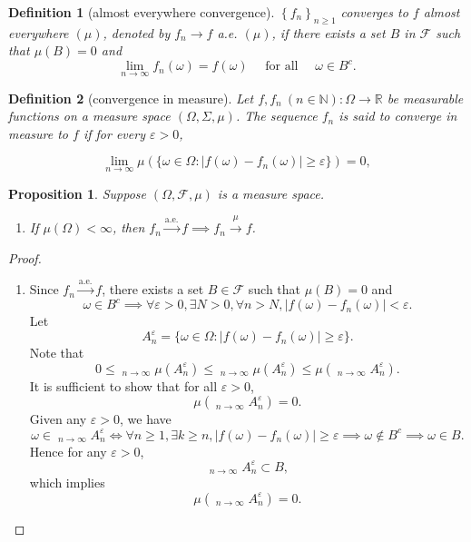 \documentclass{report}
\newtheorem{definition}{Definition}[section]
\newtheorem{proposition}{Proposition}[section]
\theoremstyle{nonumberplain}
\newtheorem{proof}{Proof.}
\DeclareMathOperator*\lowlim{\underline{lim}}
\DeclareMathOperator*\uplim{\overline{lim}}
\begin{document}
\begin{definition}[almost everywhere convergence]
	$\left\{f_{n}\right\}_{n \geq 1}$ converges to $f$ almost everywhere $(\mu)$, denoted by $f_{n} \rightarrow f$ a.e. $(\mu)$, if there exists a set $B$ in $\mathcal{F}$ such that $\mu(B)=0$ and
	$$
	\lim _{n \rightarrow \infty} f_{n}(\omega)=f(\omega) \quad \text { for all } \quad \omega \in B^{c} .
	$$
\end{definition}

\begin{definition}[convergence in measure]
	Let $f,f_{n}\ (n\in {\mathbb  N}):\Omega\to {\mathbb  R}$ be measurable functions on a measure space $(\Omega,\Sigma ,\mu )$. The sequence $ f_{n}$ is said to converge in measure to $f$ if for every $\varepsilon >0$,
	
	$$\lim_{{n\to \infty }}\mu \left(\{\omega\in \Omega:|f(\omega)-f_{n}(\omega)|\geq \varepsilon \}\right)=0,$$
\end{definition}

\begin{proposition}
	Suppose $(\Omega,\mathcal{F},\mu)$ is a measure space.
	\begin{enumerate}
		\item If $\mu(\Omega)<\infty$, then $f_n\xrightarrow{\text{a.e.}}f\implies f_n\xrightarrow{\mu}f$.
	\end{enumerate}
\end{proposition}
\begin{proof}
	\begin{enumerate}
		\item 
		Since $f_n\xrightarrow{\text{a.e.}}f$, there exists a set $B\in\mathcal{F}$ such that $\mu(B)=0$ and
		\[
			\omega\in B^c\implies\forall\varepsilon>0,\exists N>0,\forall n>N,|f(\omega)-f_n(\omega)|<\varepsilon.
		\]
		Let 
		\[
			A_n^\varepsilon = \{\omega\in \Omega:|f(\omega)-f_{n}(\omega)|\geq \varepsilon \}.
		\]
		Note that
		\[
			0\le\lowlim_{n\to\infty}\mu\left(A_{n}^\varepsilon\right)\le\uplim_{n\to\infty} \mu\left(A_{n}^\varepsilon\right)\le\mu\left(\uplim_{n\to\infty} A_{n}^\varepsilon\right).
		\]
		It is sufficient to show that for all $\varepsilon>0$,
		\[
			\mu\left(\uplim_{n\to\infty} A_{n}^\varepsilon\right)=0.
		\]
		Given any $\varepsilon>0$, we have
		\[
			\omega\in\uplim_{n\to\infty} A_{n}^\varepsilon\iff\forall n\ge1,\exists k\ge n,|f(\omega)-f_{n}(\omega)|\geq \varepsilon\implies\omega\notin B^c\implies \omega \in B.
		\]
		Hence for any $\varepsilon>0$,
		\[
			\uplim_{n\to\infty} A_{n}^\varepsilon\subset B,
		\]
		which implies 
		\[
			\mu\left(\uplim_{n\to\infty} A_{n}^\varepsilon\right)=0.
		\]
	\end{enumerate}
\end{proof}
\end{document}
